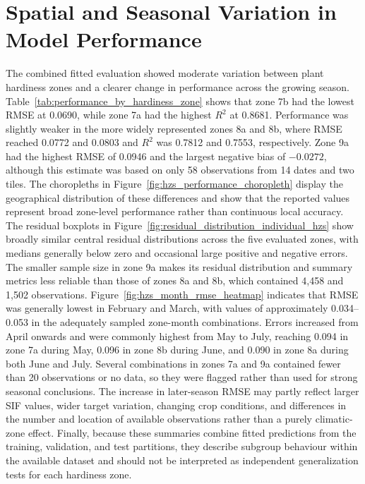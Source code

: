\section{Spatial and Seasonal Variation in Model Performance}
The combined fitted evaluation showed moderate variation between plant hardiness zones and a clearer change in performance across the growing season. Table~\ref{tab:performance_by_hardiness_zone} shows that zone 7b had the lowest RMSE at 0.0690, while zone 7a had the highest $R^2$ at 0.8681. Performance was slightly weaker in the more widely represented zones 8a and 8b, where RMSE reached 0.0772 and 0.0803 and $R^2$ was 0.7812 and 0.7553, respectively. Zone 9a had the highest RMSE of 0.0946 and the largest negative bias of $-0.0272$, although this estimate was based on only 58 observations from 14 dates and two tiles. The choropleths in Figure~\ref{fig:hzs_performance_choropleth} display the geographical distribution of these differences and show that the reported values represent broad zone-level performance rather than continuous local accuracy. The residual boxplots in Figure~\ref{fig:residual_distribution_individual_hzs} show broadly similar central residual distributions across the five evaluated zones, with medians generally below zero and occasional large positive and negative errors. The smaller sample size in zone 9a makes its residual distribution and summary metrics less reliable than those of zones 8a and 8b, which contained 4,458 and 1,502 observations. Figure~\ref{fig:hzs_month_rmse_heatmap} indicates that RMSE was generally lowest in February and March, with values of approximately 0.034--0.053 in the adequately sampled zone-month combinations. Errors increased from April onwards and were commonly highest from May to July, reaching 0.094 in zone 7a during May, 0.096 in zone 8b during June, and 0.090 in zone 8a during both June and July. Several combinations in zones 7a and 9a contained fewer than 20 observations or no data, so they were flagged rather than used for strong seasonal conclusions. The increase in later-season RMSE may partly reflect larger SIF values, wider target variation, changing crop conditions, and differences in the number and location of available observations rather than a purely climatic-zone effect. Finally, because these summaries combine fitted predictions from the training, validation, and test partitions, they describe subgroup behaviour within the available dataset and should not be interpreted as independent generalization tests for each hardiness zone.

